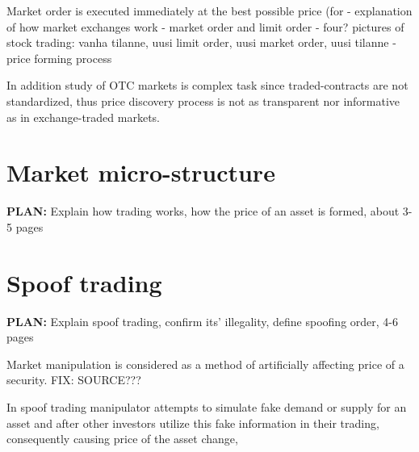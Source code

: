 \documentclass{tut-thesis}
\begin{document}
Market order is executed immediately at the best possible price (for 
- explanation of how market exchanges work
- market order and limit order
- four? pictures of stock trading: vanha tilanne, uusi limit order, uusi market order, uusi tilanne 
- price forming process

In addition study of OTC markets is complex task since traded-contracts are not standardized, thus price discovery process is not as transparent nor informative as in exchange-traded markets.

\section{Market micro-structure}
\textbf{PLAN:} Explain how trading works, how the price of an asset is formed, about 3-5 pages



\section{Spoof trading}
\textbf{PLAN:} Explain spoof trading, confirm its' illegality, define spoofing order, 4-6 pages

Market manipulation is considered as a method of artificially affecting price of a security. FIX: SOURCE???


\autocite{KyleViswanathan2008}

In spoof trading manipulator attempts to simulate fake demand or supply for an asset and after other investors utilize this fake information in their trading, consequently causing price of the asset change, 
\end{document}
